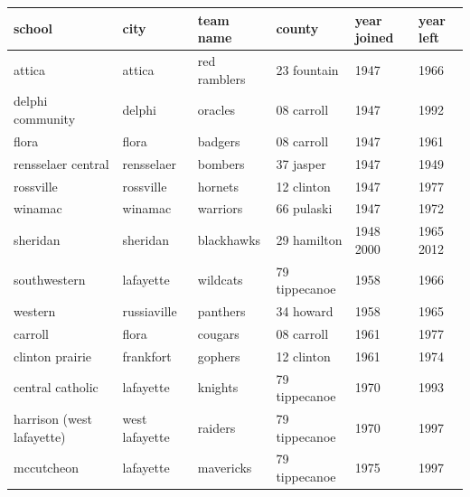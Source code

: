 \documentclass{article}
\begin{document}
\begin{tabular}{llllll}
\toprule
school & city & team name & county & year joined & year left \\
\midrule
attica & attica & red ramblers & 23 fountain & 1947 & 1966 \\
delphi community & delphi & oracles & 08 carroll & 1947 & 1992 \\
flora & flora & badgers & 08 carroll & 1947 & 1961 \\
rensselaer central & rensselaer & bombers & 37 jasper & 1947 & 1949 \\
rossville & rossville & hornets & 12 clinton & 1947 & 1977 \\
winamac & winamac & warriors & 66 pulaski & 1947 & 1972 \\
sheridan & sheridan & blackhawks & 29 hamilton & 1948 2000 & 1965 2012 \\
southwestern & lafayette & wildcats & 79 tippecanoe & 1958 & 1966 \\
western & russiaville & panthers & 34 howard & 1958 & 1965 \\
carroll & flora & cougars & 08 carroll & 1961 & 1977 \\
clinton prairie & frankfort & gophers & 12 clinton & 1961 & 1974 \\
central catholic & lafayette & knights & 79 tippecanoe & 1970 & 1993 \\
harrison (west lafayette) & west lafayette & raiders & 79 tippecanoe & 1970 & 1997 \\
mccutcheon & lafayette & mavericks & 79 tippecanoe & 1975 & 1997 \\
\bottomrule
\end{tabular}
\end{document}

